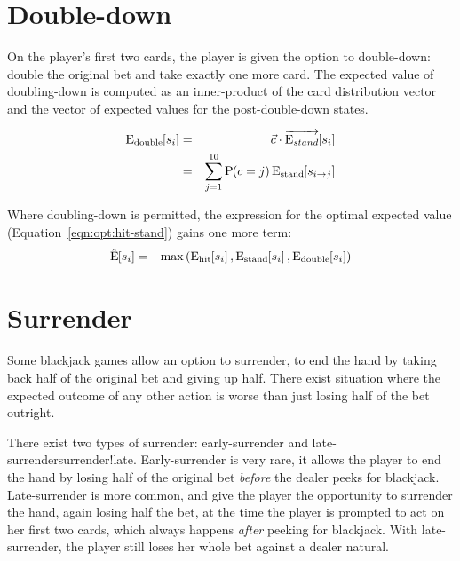 \section{Double-down}
\label{sec:basic:double}

On the player's first two cards, the player is given the option to
double-down: double the original bet and take exactly one more card.
The expected value of doubling-down is computed as an inner-product
of the card distribution vector and the vector of expected values for the
post-double-down states.

\begin{eqnarray}
\textrm{E}_{\textrm{double}}\hspace{-.5ex}\left[s_i\right] &=& \vec{c}\cdot \overrightarrow{\textrm{E}_{stand}}\hspace{-.5ex}\left[s_i\right] \nonumber \\
&=& \sum_{j=1}^{10}{\textrm{P}\hspace{-.5ex}\left(c=j\right)\textrm{E}_{\textrm{stand}}\hspace{-.5ex}\left[s_{i\rightarrow{}j}\right]}
\end{eqnarray}

Where doubling-down is permitted, the expression for the
optimal expected value (Equation~\ref{eqn:opt:hit-stand}) gains one more term:
\begin{eqnarray}
\hat{\textrm{E}}\hspace{-.5ex}\left[s_i\right] &=& \textrm{max}\left(\textrm{E}_{\textrm{hit}}\hspace{-.5ex}\left[s_i\right],\textrm{E}_{\textrm{stand}}\hspace{-.5ex}\left[s_i\right],\textrm{E}_{\textrm{double}}\hspace{-.5ex}\left[s_i\right]\right) \label{eqn:opt:hit-stand-dbl}
\end{eqnarray}

\section{Surrender}
\label{sec:basic:surrender}

Some blackjack games allow an option to surrender, 
to end the hand by taking back half of the original
bet and giving up half.
There exist situation where the expected outcome of any other action 
is worse than just losing half of the bet outright.  

There exist two types of surrender:
early-surrender and late-surrender{surrender!late}.
Early-surrender is very rare, it allows the player to 
end the hand by losing half of the original bet \emph{before}
the dealer peeks for blackjack.
Late-surrender is more common, and give the player the opportunity to
surrender the hand, again losing half the bet, 
at the time the player is prompted to act on her first two cards, 
which always happens \emph{after} peeking for blackjack.  
With late-surrender, the player still loses her whole bet against 
a dealer natural.

